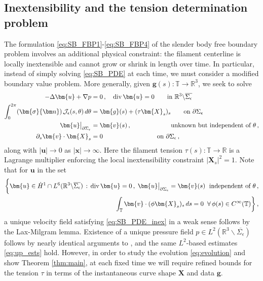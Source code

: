 \documentclass[11pt,reqno]{amsart}
\newcommand{\R}{\mathbb{R}}
\newcommand{\T}{\mathbb{T}}
\newcommand{\bu}{\bm{u}}
\newcommand{\bx}{\bm{x}}
\newcommand{\X}{\bm{X}}
\newcommand{\bv}{\bm{v}}
\newcommand{\p}{\partial}
\renewcommand{\div}{{\rm{div}\,}}
\newcommand{\abs}[1]{\left\lvert #1 \right\rvert}
\newcommand{\mc}[1]{\mathcal{#1}}
\theoremstyle{definition}
\begin{document}
\subsection{Inextensibility and the tension determination problem}\label{subsec:inext}
The formulation \eqref{eq:SB_FBP1}-\eqref{eq:SB_FBP4} of the slender body free boundary problem involves an additional physical constraint: the filament centerline is locally inextensible and cannot grow or shrink in length over time. In particular, instead of simply solving \eqref{eq:SB_PDE} at each time, we must consider a modified boundary value problem.
More generally, given $\bm{g}(s):\T\to \R^3$, we seek to solve
\begin{equation}\label{eq:SB_PDE_inex}
\begin{aligned}
-\Delta \bu + \nabla p &=0\,, \quad \div\bu=0\qquad \text{in }\R^3\backslash\overline{\Sigma_\epsilon} \\
\int_0^{2\pi}(\bm{\sigma}{\bm n})\,\mc{J}_\epsilon(s,\theta)\,d\theta &= \bm{g}(s)+(\tau\X_s)_s  \qquad \text{on }\p\Sigma_\epsilon \\
\bu\big|_{\p\Sigma_\epsilon} &= \bv(s)\,, \hspace{2.2cm} \text{unknown but independent of }\theta\,, \\
\p_s\bv\cdot\X_s &=0 \hspace{3cm} \text{on }\p\Sigma_\epsilon\,,
\end{aligned}
\end{equation}
along with $\abs{\bu}\to 0$ as $\abs{\bx}\to \infty$. Here the filament tension $\tau(s):\T\to\R$ is a Lagrange multiplier enforcing the local inextensibility constraint $\abs{\X_s}^2=1$.
%
Note that for $\bu$ in the set 
\begin{equation}
\begin{aligned}
  \bigg\{\bu\in \dot H^1\cap L^6(\R^3\backslash\overline{\Sigma_\epsilon})\,:\, \div\bu=0\,,\; \bu\big|_{\p\Sigma_\epsilon}=\bv(s)\; \text{ independent of }\theta\,, \\
  \int_\T \bv\cdot(\phi\X_s)_s\,ds = 0\;\; \forall\,\phi(s)\in C^\infty(\T)\bigg\}\,,
\end{aligned}
\end{equation}
a unique velocity field satisfying \eqref{eq:SB_PDE_inex} in a weak sense follows by the Lax-Milgram lemma. Existence of a unique pressure field $p\in L^2(\R^3\backslash\overline{\Sigma_\epsilon})$ follows by nearly identical arguments to \cite{closed_loop}, and the same $L^2$-based estimates \eqref{eq:up_ests} hold. However, in order to study the evolution \eqref{eq:evolution} and show Theorem \ref{thm:main}, at each fixed time we will require refined bounds for the tension $\tau$ in terms of the instantaneous curve shape $\X$ and data $\bm{g}$. 
\end{document}
